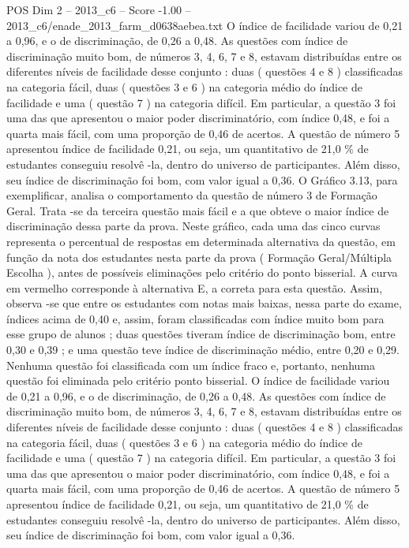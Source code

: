 \begin{textsample}{POS Dim 2 – 2013\_c6 – Score -1.00 – 2013\_c6/enade\_2013\_farm\_d0638aebea.txt}
O índice de facilidade variou de 0,21 a 0,96, e o de discriminação, de 0,26 a 0,48.
As questões com índice de discriminação muito bom, de números 3, 4, 6, 7 e 8, estavam distribuídas entre os diferentes níveis de facilidade desse conjunto : duas ( questões 4 e 8 ) classificadas na categoria fácil, duas ( questões 3 e 6 ) na categoria médio do índice de facilidade e uma ( questão 7 ) na categoria difícil.
Em particular, a questão 3 foi uma das que apresentou o maior poder discriminatório, com índice 0,48, e foi a quarta mais fácil, com uma proporção de 0,46 de acertos.
A questão de número 5 apresentou índice de facilidade 0,21, ou seja, um quantitativo de 21,0 \% de estudantes conseguiu resolvê -la, dentro do universo de participantes.
Além disso, seu índice de discriminação foi bom, com valor igual a 0,36.
O Gráfico 3.13, para exemplificar, analisa o comportamento da questão de número 3 de Formação Geral.
Trata -se da terceira questão mais fácil e a que obteve o maior índice de discriminação dessa parte da prova.
Neste gráfico, cada uma das cinco curvas representa o percentual de respostas em determinada alternativa da questão, em função da nota dos estudantes nesta parte da prova ( Formação Geral/Múltipla Escolha ), antes de possíveis eliminações pelo critério do ponto bisserial.
A curva em vermelho corresponde à alternativa E, a correta para esta questão.
Assim, observa -se que entre os estudantes com notas mais baixas, nessa parte do exame, índices acima de 0,40 e, assim, foram classificadas com índice muito bom para esse grupo de alunos ; duas questões tiveram índice de discriminação bom, entre 0,30 e 0,39 ; e uma questão teve índice de discriminação médio, entre 0,20 e 0,29.
Nenhuma questão foi classificada com um índice fraco e, portanto, nenhuma questão foi eliminada pelo critério ponto bisserial.
O índice de facilidade variou de 0,21 a 0,96, e o de discriminação, de 0,26 a 0,48.
As questões com índice de discriminação muito bom, de números 3, 4, 6, 7 e 8, estavam distribuídas entre os diferentes níveis de facilidade desse conjunto : duas ( questões 4 e 8 ) classificadas na categoria fácil, duas ( questões 3 e 6 ) na categoria médio do índice de facilidade e uma ( questão 7 ) na categoria difícil.
Em particular, a questão 3 foi uma das que apresentou o maior poder discriminatório, com índice 0,48, e foi a quarta mais fácil, com uma proporção de 0,46 de acertos.
A questão de número 5 apresentou índice de facilidade 0,21, ou seja, um quantitativo de 21,0 \% de estudantes conseguiu resolvê -la, dentro do universo de participantes.
Além disso, seu índice de discriminação foi bom, com valor igual a 0,36.

\end{textsample}
